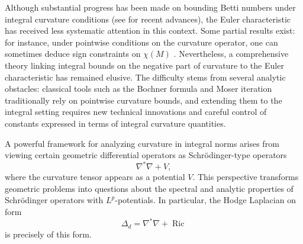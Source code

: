 \documentclass[12pt, twoside]{article}
\theoremstyle{definition}
\numberwithin{equation}{section}
\def \De {\Delta}
\def\na {\nabla}
\begin{document}
Although substantial progress has been made on bounding Betti numbers under integral curvature conditions (see \cite{Yu2022} for recent advances), the Euler characteristic has received less systematic attention in this context.  Some partial results exist: for instance, under pointwise conditions on the curvature operator, one can sometimes deduce sign constraints on $\chi(M)$ \cite{Bourguignon1978}. Nevertheless, a comprehensive theory linking integral bounds on the negative part of curvature to the Euler characteristic has remained elusive. The difficulty stems from several analytic obstacles: classical tools such as the Bochner formula and Moser iteration traditionally rely on pointwise curvature bounds, and extending them to the integral setting requires new technical innovations and careful control of constants expressed in terms of integral curvature quantities.

A powerful framework for analyzing curvature in integral norms arises from viewing certain geometric differential operators as Schrödinger-type operators 
$$\na^{\ast}\na+V,$$ 
where the curvature tensor appears as a potential $V$. This perspective transforms geometric problems into questions about the spectral and analytic properties of Schrödinger operators with $L^{p}$-potentials. In particular, the Hodge Laplacian on form
$$\De_{d}=\na^{\ast}\na+\operatorname{Ric}$$
is precisely of this form. 
\end{document}
